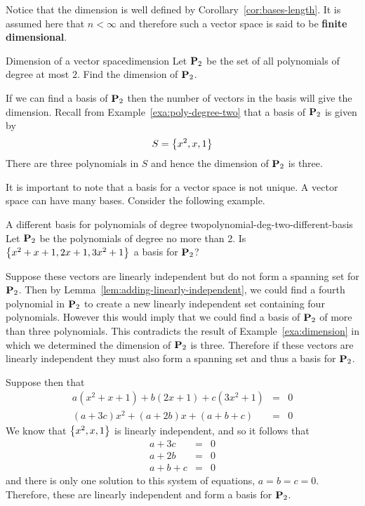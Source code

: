 Notice that the dimension is well defined by Corollary~\ref{cor:bases-length}. It is assumed here
that $n<\infty $ and therefore such a vector space is said to be \textbf{finite
dimensional}.

\begin{example}{Dimension of a vector space}{dimension}
Let $\mathbf{P}_2$ be the set of all polynomials of degree at most $2$. Find the dimension of $\mathbf{P}_2$.
\end{example}

\begin{solution}
If we can find a basis of $\mathbf{P}_2$ then the number of vectors in the basis will give the dimension. Recall from Example~\ref{exa:poly-degree-two} that a basis of $\mathbf{P}_2$ is given by
\[
S  = \left\{x^2, x, 1 \right\}
\]
There are three polynomials in $S$ and hence the dimension of $\mathbf{P}_2$ is three.
\end{solution}

It is important to note that a basis for a vector space is not unique. A vector space can have many bases. Consider the following example.

\begin{example}{A different basis for polynomials of degree two}{polynomial-deg-two-different-basis}
Let $\mathbf{P}_2$ be the polynomials of degree no more than 2. Is $\left\{
x^{2}+x+1,2x+1,3x^{2}+1\right\} $ a basis for $\mathbf{P}_2$?
\end{example}

\begin{solution}
Suppose these vectors are linearly independent but do not form a spanning set for $\mathbf{P}_2$. Then by Lemma~\ref{lem:adding-linearly-independent}, we could find a fourth polynomial in $\mathbf{P}_2$ to create a new linearly independent
set containing four polynomials. However this would imply that we could find a basis of $\mathbf{P}_2$ of more than three polynomials. This contradicts the result of Example~\ref{exa:dimension} in which we determined the dimension of $\mathbf{P}_2$ is three.  Therefore if these vectors are linearly independent they must also form a spanning set and thus a basis for $\mathbf{P}_2$.

Suppose then that
\begin{eqnarray*}
a(x^{2}+x+1) +b(2x+1) +c(3x^{2}+1) &=& 0\\
(a+3c) x^{2}+(a+2b) x+(a+b+c) &=& 0
\end{eqnarray*}
We know that $\left\{x^2, x, 1 \right\}$ is linearly independent, and so it follows that
\begin{eqnarray*}
a+3c &=& 0 \\
a+2b &=& 0 \\
a+b+c &=& 0
\end{eqnarray*}
and there is only one solution to this system of equations, $a=b=c=0$.
Therefore, these are linearly independent and form a basis for $\mathbf{P}_2$.
\end{solution}

